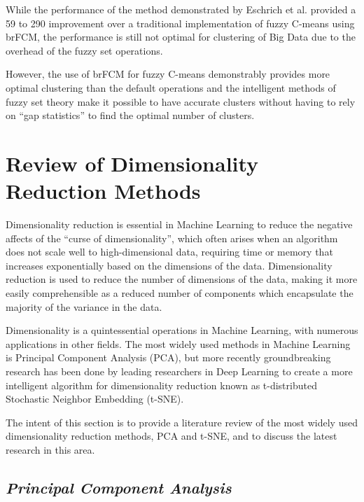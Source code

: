 \documentclass{article}
\begin{document}
While the performance of the method demonstrated by Eschrich et al. provided a 59 to 290 improvement over a traditional implementation of fuzzy C-means using brFCM\cite{eschrich2003fast}, the performance is still not optimal for clustering of Big Data due to the overhead of the fuzzy set operations\cite{jain2010}.

However, the use of brFCM for fuzzy C-means demonstrably provides more optimal clustering than the default operations and the intelligent methods of fuzzy set theory make it possible to have accurate clusters without having to rely on ``gap statistics''  to find the optimal number of clusters\cite{tibshirani2001estimating}.








\section{Review of Dimensionality Reduction Methods}

Dimensionality reduction is essential in Machine Learning to reduce the negative affects of the ``curse of dimensionality'', which often arises when an algorithm does not scale well to high-dimensional data, requiring time or memory that increases exponentially based on the dimensions of the data\cite{domingos2012few}. Dimensionality reduction is used to reduce the number of dimensions of the data, making it more easily comprehensible as a reduced number of components which encapsulate the majority of the variance in the data.

Dimensionality is a quintessential operations in Machine Learning, with numerous applications in other fields. The most widely used methods in Machine Learning is Principal Component Analysis (PCA)\cite{jain2010, domingos2012few, dietterich2002machine}, but more recently groundbreaking research has been done by leading researchers in Deep Learning to create a more intelligent algorithm for dimensionality reduction known as t-distributed Stochastic Neighbor Embedding (t-SNE).

The intent of this section is to provide a literature review of the most widely used dimensionality reduction methods, PCA and t-SNE, and to discuss the latest research in this area.




\subsection{\emph{Principal Component Analysis}}
\end{document}
